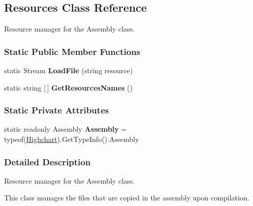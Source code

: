 \hypertarget{classHighcharts_1_1Resources}{}\subsection{Resources Class Reference}
\label{classHighcharts_1_1Resources}


Resource manager for the Assembly class.  


\subsubsection*{Static Public Member Functions}
\begin{DoxyCompactItemize}
\item 
\mbox{\label{classHighcharts_1_1Resources_ad3f81074aa73ae9bc68128f6bebc8ec9}} 
static Stream {\bfseries Load\+File} (string resource)
\item 
\mbox{\label{classHighcharts_1_1Resources_ada9fe61069360cd3ec9187f10bb5b947}} 
static string \mbox{[}$\,$\mbox{]} {\bfseries Get\+Resources\+Names} ()
\end{DoxyCompactItemize}
\subsubsection*{Static Private Attributes}
\begin{DoxyCompactItemize}
\item 
\mbox{\label{classHighcharts_1_1Resources_a0eb1013cca2e8e9c882143930723fc75}} 
static readonly Assembly {\bfseries Assembly} = typeof(\hyperlink{classHighcharts_1_1Highchart}{Highchart}).Get\+Type\+Info().Assembly
\end{DoxyCompactItemize}


\subsubsection{Detailed Description}
Resource manager for the Assembly class. 

This class manages the files that are copied in the assembly upon compilation. 
